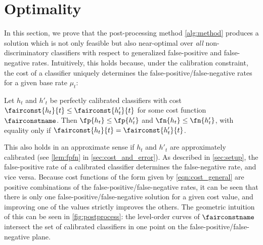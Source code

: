 \section{Optimality}
\label{sec:optimality}




In this section, we prove that the post-processing method \autoref{alg:method}
produces a solution which is not only feasible but also near-optimal over
\emph{all} non-discriminatory classifiers with respect to generalized
false-positive and false-negative rates. Intuitively, this holds because,
under the calibration constraint, the cost of a classifier uniquely determines
the false-positive/false-negative rates for a given base rate $\mu_t$:
%
\begin{lemma}
  Let $h_t$ and $h'_t$ be perfectly calibrated classifiers with cost
  $\fairconst{h_t}{t} \leq \fairconst{h'_t}{t}$ for some
  cost function $\fairconstname$. Then $\fp{h_t} \leq \fp{h'_t}$
  and $\fn{h_t} \leq \fn{h'_t}$, with equality only if $\fairconst{h_t}{t} = \fairconst{h'_t}{t}$.
  \label{lem:fpfn_exact}
\end{lemma}
%
This also holds in an approximate sense if $h_t$ and $h'_t$ are approximately
calibrated (see \autoref{lem:fpfn} in \autoref{sec:cost_and_error}).
As described in \autoref{sec:setup}, the false-positive rate of a calibrated classifier
determines the false-negative rate, and vice versa. Because cost functions
of the form given by \eqref{eqn:cost_general} are positive combinations of
the false-positive/false-negative rates, it can be seen that there is only one
false-positive/false-negative solution for a given cost value, and improving one
of the values strictly improves the others.
The geometric intuition of this can be seen in \autoref{fig:postprocess}:
the level-order curves of $\fairconstname$ intersect the set of
calibrated classifiers in one point on the false-positive/false-negative plane.

